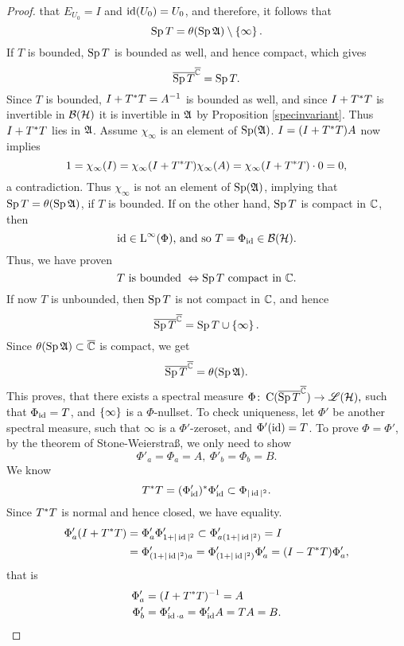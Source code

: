 \begin{proof}
that $E_{U_0} = I$ and $\operatorname{id}(U_0) = U_0$, and therefore, it follows that
\[
 \operatorname{Sp} T = \theta ( \operatorname{Sp} \mathfrak{A} ) \setminus \left\lbrace \infty \right\rbrace.
\]
If $T$ is bounded, $\operatorname{Sp} T$ is bounded as well, and hence compact, which gives
\[
\overline{\operatorname{Sp} T }^{{\overline{\mathbb{C}}}} = \operatorname{Sp} T.
\]
Since $T$ is bounded, $I + T^{*} T = A^{-1}$ is bounded as well, and since 
$I +T ^{*} T$ is invertible in $\mathcal{B}(\mathcal{H})$ it is invertible in $\mathfrak{A}$ by Proposition
\ref{specinvariant}. Thus $I + T ^{*} T $ lies in $\mathfrak{A}$. Assume $\chi_\infty$ is an
element of $\operatorname{Sp}(\mathfrak{A})$. $I = (I +T ^{*} T )A$
now implies
\[
 1 = \chi_\infty (I) = \chi_\infty ( I+ T ^{*} T) \chi_\infty ( A) = 
 \chi_\infty ( I + T ^{*} T) \cdot 0 = 0 ,
\]
a contradiction. Thus  $\chi_\infty$ is not an element of $\operatorname{Sp}(\mathfrak{A})$, implying
that $ \operatorname{Sp} T  = \theta ( \operatorname{Sp} \mathfrak{A} )$, if $T$  is bounded.
If on the other hand, $\operatorname{Sp} T$ is compact in $\mathbb{C}$, then 
\[
 \operatorname{id} \in {\text{L}^\infty }(\Phi) \text{, and so } T= \Phi_{\operatorname{id}} \in \mathcal{B}(\mathcal{H}).
\]
Thus, we have proven 
\[
 T \text{ is bounded } \Leftrightarrow \operatorname{Sp} T \text{ compact in } \mathbb{C}.
\]
If now $T$ is unbounded, then $\operatorname{Sp} T$ is not compact in $\mathbb{C}$, and hence
\[
\overline{\operatorname{Sp} T}^{{\overline{\mathbb{C}}}} = \operatorname{Sp} T \cup \left\lbrace \infty \right\rbrace.
\]
Since $\theta(\operatorname{Sp} \mathfrak{A}) \subset {\overline{\mathbb{C}}}$ is compact, we get
\[
 \overline{\operatorname{Sp} T}^{{\overline{\mathbb{C}}}} = \theta ( \operatorname{Sp} \mathfrak{A}).
\]
This proves, that there exists a spectral measure 
$\Phi \colon \operatorname{C}(\overline{\operatorname{Sp} T}^{{\overline{\mathbb{C}}}}) \to \mathscr{L}(\mathcal{H}),$ such that $\Phi_{\operatorname{id}} = T$,
and $\left\lbrace \infty \right\rbrace$ is a $\Phi$-nullset.
 To check uniqueness, let $\Phi'$ be another spectral measure, such that
$\infty$ is a $\Phi'$-zeroset, and $\Phi'( \operatorname{id}) = T$. To prove $\Phi = \Phi'$,
by the theorem of Stone-Weierstraß, we only need to show
\[
 \Phi'_a = \Phi_a = A,~ \Phi'_b = \Phi_b=B.
\]
We know
\[
 T^{*} T = (\Phi'_{\operatorname{id}}) ^{*} \Phi'_{\operatorname{id}} \subset \Phi_{|\operatorname{id}|^2}.
\]
Since $T^{*} T$ is normal and hence closed, we have equality.
\begin{align*}
 \Phi'_a ( I + T ^{*} T ) &= \Phi'_a \Phi'_{1 +| \operatorname{id} | ^2} \subset 
 \Phi'_{a (1 + |\operatorname{id}|^2)} = I \\&= \Phi'_{ (1 + |\operatorname{id}|^2)a} 
 = \Phi'_{(1 + |\operatorname{id}|^2)}\Phi'_{a}  = (I - T ^{*} T) \Phi'_a,
 \end{align*}
 that is 
 \begin{align*}
 \Phi'_a &= (I + T ^{*} T)^{-1} = A \\
 \Phi'_b &= \Phi'_{\operatorname{id} \cdot a} = \Phi'_{\operatorname{id}} A = TA = B.
\end{align*}
\end{proof}


















